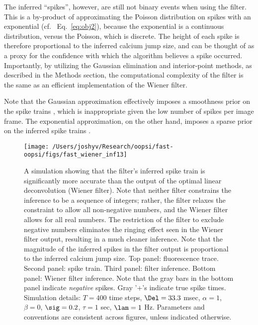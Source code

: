 The inferred ``spikes'', however, are still not binary events when using the \foopsi filter.  This is a by-product of approximating the Poisson distribution on spikes with an exponential (cf.~ Eq.~\eqref{eq:obj2}), because the exponential is a continuous distribution, versus the Poisson, which is discrete.  The height of each spike is therefore proportional to the inferred calcium jump size, and can be thought of as a proxy for the confidence with which the algorithm believes a spike occurred.   Importantly, by utilizing the Gaussian elimination and interior-point methods, as described in the Methods section, the computational complexity of the \foopsi filter is the same as an efficient implementation of the Wiener filter.  

Note that the Gaussian approximation effectively imposes a smoothness prior on the spike trains \cite{WuGallant06}, which is inappropriate given the low number of spikes per image frame.  The exponential approximation, on the other hand, imposes a sparse prior on the inferred spike trains \cite{Seeger08}.  



\begin{figure}[h!]
\centering \texttt{[image: /Users/joshyv/Research/oopsi/fast-oopsi/figs/fast\_wiener\_inf13]}
\caption[\foopsi filter outperforms Wiener filter]{A simulation showing that the \foopsi filter's inferred spike train is significantly more accurate than the output of the optimal linear deconvolution (Wiener filter). Note that neither filter constrains the inference to be a sequence of integers; rather, the \foopsi filter relaxes the constraint to allow all non-negative numbers, and the Wiener filter allows for all real numbers.  The restriction of the \foopsi filter to exclude negative numbers eliminates the ringing effect seen in the Wiener filter output, resulting in a much cleaner inference.  Note that the magnitude of the inferred spikes in the \foopsi filter output is proportional to the inferred calcium jump size.  Top panel: fluorescence trace.  Second panel: spike train.  Third panel: \foopsi filter inference.  Bottom panel: Wiener filter inference.  Note that the gray bars in the bottom panel indicate \emph{negative} spikes. Gray '$+$'s indicate true spike times.  Simulation details: $T= 400$ time steps, $\Del=33.3$ msec, $\alpha=1$, $\beta=0$, $\sig=0.2$, $\tau=1$ sec, $\lam=1$ Hz. Parameters and conventions are consistent across figures, unless indicated otherwise.} \label{fig:woopsi_inf}
\end{figure}

